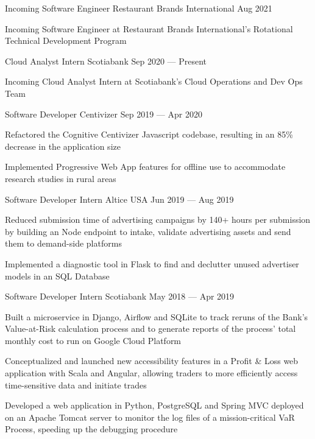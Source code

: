 \begin{cventries}
  \cventry
    {Incoming Software Engineer}
    {Restaurant Brands International}
    {}
    {Aug 2021}
    {}
    {
      \begin{cvitems}
        \item {Incoming Software Engineer at Restaurant Brands International's Rotational Technical Development Program}
      \end{cvitems}
    }
  \cventry
    {Cloud Analyst Intern}
    {Scotiabank}
    {}
    {Sep 2020 --- Present}
    {}
    {
      \begin{cvitems}
        \item {Incoming Cloud Analyst Intern at Scotiabank's Cloud Operations and Dev Ops Team}
      \end{cvitems}
    }
  \cventry
    {Software Developer}
    {Centivizer}
    {}
    {Sep 2019 --- Apr 2020}
    {}
    {
      \begin{cvitems}
        \item {Refactored the Cognitive Centivizer Javascript codebase, resulting in an 85\% decrease in the application size}
        \item {Implemented Progressive Web App features for offline use to accommodate research studies in rural areas}
      \end{cvitems}
    }

  \cventry
    {Software Developer Intern}
    {Altice USA}
    {}
    {Jun 2019 --- Aug 2019}
    {}
    {
    \begin{cvitems}
      \item {Reduced submission time of advertising campaigns by 140+ hours per submission by building an Node endpoint to intake, validate advertising assets and send them to demand-side platforms}
      \item {Implemented a diagnostic tool in Flask to find and declutter unused advertiser models in an SQL Database}
    \end{cvitems}
    }

  \cventry
    {Software Developer Intern}
    {Scotiabank}
    {}
    {May 2018 --- Apr 2019}
    {}
    {
      \begin{cvitems}
        \item {Built a microservice in Django, Airflow and SQLite to track reruns of the Bank's Value-at-Risk calculation process and to generate reports of the process' total monthly cost to run on Google Cloud Platform}
        \item {Conceptualized and launched new accessibility features in a Profit \& Loss web application with Scala and Angular, allowing traders to more efficiently access time-sensitive data and initiate trades}
        \item {Developed a web application in Python, PostgreSQL and Spring MVC deployed on an Apache Tomcat server to monitor the log files of a mission-critical VaR Process, speeding up the debugging procedure}
      \end{cvitems}
    }
\end{cventries}
